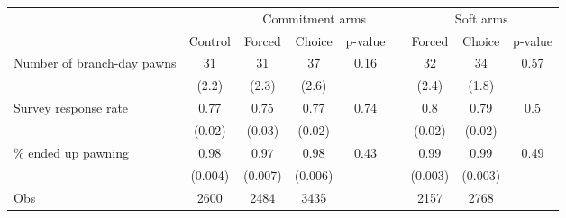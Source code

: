 \begin{tabular}{lcccccccc}
\toprule
      &       & \multicolumn{3}{c}{Commitment arms} &       & \multicolumn{3}{c}{Soft arms} \\
\cmidrule{3-5}\cmidrule{7-9}      & Control & Forced & Choice & p-value &       & Forced & Choice  & p-value \\
\midrule
\midrule
Number of branch-day pawns & 31    & 31    & 37    & 0.16  &       & 32    & 34    & 0.57 \\
      & (2.2) & (2.3) & (2.6) &       &       & (2.4) & (1.8) &  \\
Survey response rate & 0.77  & 0.75  & 0.77  & 0.74  &       & 0.8   & 0.79  & 0.5 \\
      & (0.02) & (0.03) & (0.02) &       &       & (0.02) & (0.02) &  \\
\% ended up pawning & 0.98  & 0.97  & 0.98  & 0.43  &       & 0.99  & 0.99  & 0.49 \\
      & (0.004) & (0.007) & (0.006) &       &       & (0.003) & (0.003) &  \\
\midrule
Obs   & 2600  & 2484  & 3435  &       &       & 2157  & 2768  &  \\
\bottomrule
\bottomrule
\end{tabular}%

